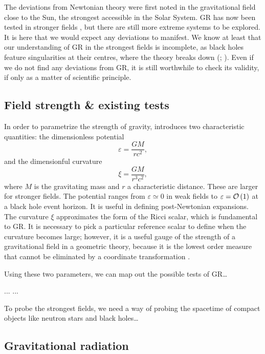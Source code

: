 {The deviations from Newtonian theory were first noted in the gravitational field close to the Sun, the strongest accessible in the Solar System. GR has now been tested in stronger fields \citep{Will2006}, but there are still more extreme systems to be explored. It is here that we would expect any deviations to manifest. We know at least that our understanding of GR in the strongest fields is incomplete, as black holes feature singularities at their centres, where the theory breaks down (\citealt[section 34.6]{Misner1973}; \citealt[chapter 9]{Wald1984}). Even if we do not find any deviations from GR, it is still worthwhile to check its validity, if only as a matter of scientific principle.

\subsection{Field strength \& existing tests}

In order to parametrize the strength of gravity, \citet{Psaltis2008a} introduces two characteristic quantities: the dimensionless potential
\begin{equation}
\varepsilon = \frac{GM}{rc^2},
\end{equation}
and the dimensionful curvature
\begin{equation}
\xi = \frac{GM}{r^3c^2},
\end{equation}
where $M$ is the gravitating mass and $r$ a characteristic distance. These are larger for stronger fields. The potential ranges from $\varepsilon \simeq 0$ in weak fields to $\varepsilon = \mathcal{O}\left({1}\right)$ at a black hole event horizon. It is useful in defining post-Newtonian expansions. The curvature $\xi$ approximates the form of the Ricci scalar, which is fundamental to GR. It is necessary to pick a particular reference scalar to define when the curvature becomes large; however, it is a useful gauge of the strength of a gravitational field in a geometric theory, because it is the lowest order measure that cannot be eliminated by a coordinate transformation \citep[chapter 7]{Hobson2006}.

Using these two parameters, we can map out the possible tests of GR\ldots

...
...

To probe the strongest fields, we need a way of probing the spacetime of compact objects like neutron stars and black holes\ldots 

\subsection{Gravitational radiation}

}
